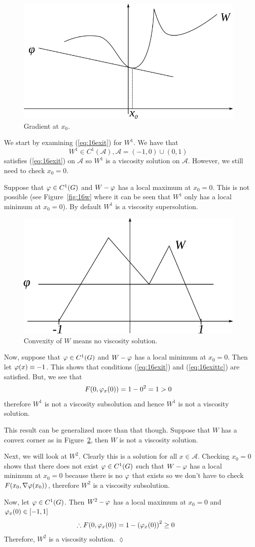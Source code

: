 \begin{figure}[ht!]
\centering
\includegraphics[width=.4\textwidth]{images/16x0}%
\caption{Gradient at $x_0$.}
\label{fig:16x0}
\end{figure}

\begin{example}
We start by examining (\ref{eq:16exit}) for $W^1$.
We have that
$$W^1\in C^1(\mathcal{A}), \mathcal{A}=(-1,0)\cup(0,1)$$
satisfies (\ref{eq:16exit}) on $\mathcal{A}$ so $W^1$ is a viscosity solution on $\mathcal{A}$.
However, we still need to check $x_0=0$.

Suppose that $\varphi\in C^1(G)$ and $W-\varphi$ has a local maximum at $x_0=0$.
This is not possible (see Figure~\ref{fig:16w} where it can be seen that $W^1$ only has a local minimum at $x_0=0$).
By default $W^1$ is a viscosity supersolution.

\begin{figure}[ht!]
\centering
\includegraphics[width=.4\textwidth]{images/16vs}
\caption{Convexity of $W$ means no viscosity solution.}
\label{fig:16vs}
\end{figure}

Now, suppose that $\varphi\in C^1(G)$ and $W-\varphi$ has a local minimum at $x_0=0$.
Then let $\varphi(x)\equiv-1$.
This shows that conditions (\ref{eq:16exit}) and (\ref{eq:16exittc}) are satisfied.
But, we see that
$$F(0,\varphi_x(0))=1-0^2=1>0$$
therefore $W^1$ is not a viscosity subsolution and hence $W^1$ is not a viscosity solution.

This result can be generalized more than that though.
Suppose that $W$ has a convex corner as in Figure~\ref{fig:16vs}, then $W$ is not a viscosity solution.

Next, we will look at $W^2$.
Clearly this is a solution for all $x\in\mathcal{A}$.
Checking $x_0=0$ shows that there does not exist $\varphi\in C^1(G)$ such that $W-\varphi$ has a local minimum at $x_0=0$ because there is no $\varphi$ that exists so we don't have to check $F(x_0,\nabla\varphi(x_0))$, therefore $W^2$ is a viscosity subsolution.

Now, let $\varphi\in C^1(G)$.
Then $W^2-\varphi$ has a local maximum at $x_0=0$ and $\varphi_x(0)\in[-1,1]$
\begin{align*}
&\therefore F(0,\varphi_x(0)) = 1-{(\varphi_x(0))}^2\geq0
\end{align*}
Therefore, $W^2$ is a viscosity solution.
$\lozenge$
\end{example}

